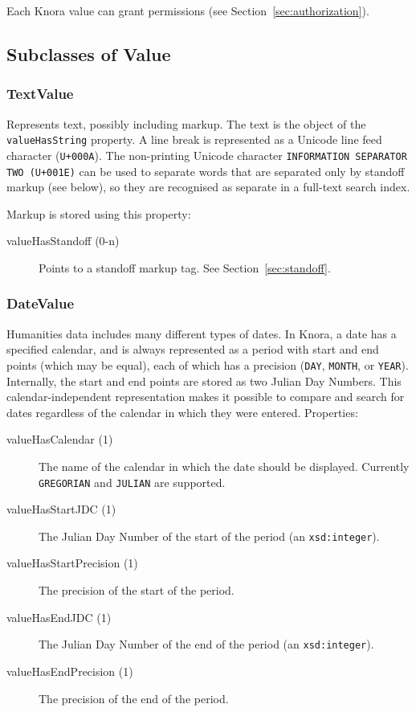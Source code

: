 \documentclass[12pt, a4paper]{article}
\begin{document}
Each Knora value can grant permissions (see Section~\ref{sec:authorization}).

\subsection{Subclasses of Value}

\subsubsection{TextValue}

Represents text, possibly including markup. The text is the object of the \texttt{valueHasString} property. A line break is represented as a Unicode line feed character (\texttt{U+000A}). The non-printing Unicode character \texttt{INFORMATION SEPARATOR TWO (U+001E)} can be used to separate words that are separated only by standoff markup (see below), so they are recognised as separate in a full-text search index.

Markup is stored using this property:

\begin{description}
	\item[valueHasStandoff (0-n)] Points to a standoff markup tag. See Section~\ref{sec:standoff}.
\end{description}

\subsubsection{DateValue}

Humanities data includes many different types of dates. In Knora, a date has a specified calendar, and is always represented as a period with start and end points (which may be equal), each of which has a precision (\texttt{DAY}, \texttt{MONTH}, or \texttt{YEAR}). Internally, the start and end points are stored as two Julian Day Numbers. This calendar-independent representation makes it possible to compare and search for dates regardless of the calendar in which they were entered. Properties:

\begin{description}
	\item[valueHasCalendar (1)] The name of the calendar in which the date should be displayed. Currently \texttt{GREGORIAN} and \texttt{JULIAN} are supported.
	\item[valueHasStartJDC (1)] The Julian Day Number of the start of the period (an \texttt{xsd:integer}).
	\item[valueHasStartPrecision (1)] The precision of the start of the period.
	\item[valueHasEndJDC (1)] The Julian Day Number of the end of the period (an \texttt{xsd:integer}).
	\item[valueHasEndPrecision (1)] The precision of the end of the period.
\end{description}
\end{document}
